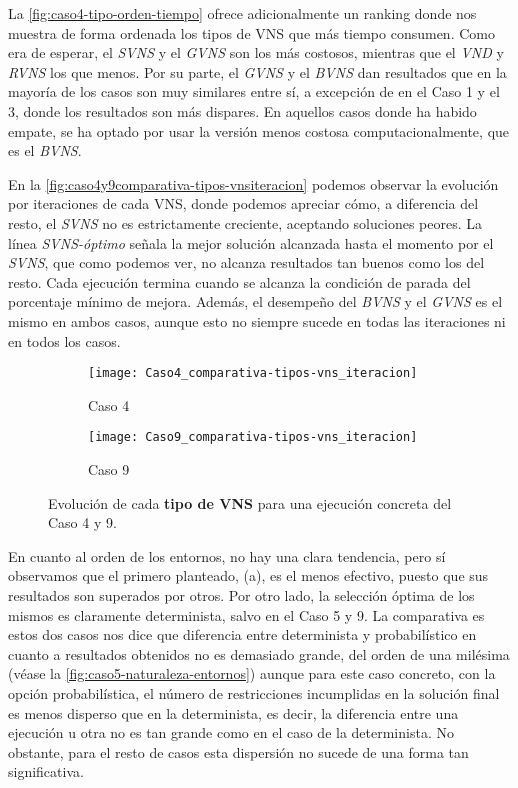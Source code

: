 La \autoref{fig:caso4-tipo-orden-tiempo} ofrece adicionalmente un ranking donde nos muestra de forma ordenada los tipos de VNS que más tiempo consumen. Como era de esperar, el \textit{SVNS} y el \textit{GVNS} son los más costosos, mientras que el \textit{VND} y \textit{RVNS} los que menos. Por su parte, el \textit{GVNS} y el \textit{BVNS} dan resultados que en la mayoría de los casos son muy similares entre sí, a excepción de en el Caso 1 y el 3, donde los resultados son más dispares. En aquellos casos donde ha habido empate, se ha optado por usar la versión menos costosa computacionalmente, que es el \textit{BVNS}.

En la \autoref{fig:caso4y9comparativa-tipos-vnsiteracion} podemos observar la evolución por iteraciones de cada VNS, donde podemos apreciar cómo, a diferencia del resto, el \textit{SVNS} no es estrictamente creciente, aceptando soluciones peores. La línea \textit{SVNS-óptimo} señala la mejor solución alcanzada hasta el momento por el \textit{SVNS}, que como podemos ver, no alcanza resultados tan buenos como los del resto. Cada ejecución termina cuando se alcanza la condición de parada del porcentaje mínimo de mejora. Además, el desempeño del \textit{BVNS} y el \textit{GVNS} es el mismo en ambos casos, aunque esto no siempre sucede en todas las iteraciones ni en todos los casos.

\begin{figure}
	\begin{subfigure}{\linewidth}
		\centering
		\texttt{[image: Caso4\_comparativa-tipos-vns\_iteracion]}
		\caption{Caso 4}
		\label{fig:caso4comparativa-tipos-vnsiteracion}
	\end{subfigure}

	\begin{subfigure}{\linewidth}
		\centering
		\texttt{[image: Caso9\_comparativa-tipos-vns\_iteracion]}
		\caption{Caso 9}
		\label{fig:caso9comparativa-tipos-vnsiteracion}
	\end{subfigure}
	\caption[Evolución de cada tipo de VNS para una ejecución concreta del Caso 4 y 9.]{Evolución de cada \textbf{tipo de VNS} para una ejecución concreta del Caso 4 y 9.}
	\label{fig:caso4y9comparativa-tipos-vnsiteracion}
\end{figure}

En cuanto al orden de los entornos, no hay una clara tendencia, pero sí observamos que el primero planteado, (a), es el menos efectivo, puesto que sus resultados son superados por otros. Por otro lado, la selección óptima de los mismos es claramente determinista, salvo en el Caso 5 y 9. 
La comparativa es estos dos casos nos dice que diferencia entre determinista y probabilístico en cuanto a resultados obtenidos no es demasiado grande, del orden de una milésima (véase la \autoref{fig:caso5-naturaleza-entornos}) aunque para este caso concreto, con la opción probabilística, el número de restricciones incumplidas en la solución final es menos disperso que en la determinista, es decir, la diferencia entre una ejecución u otra no es tan grande como en el caso de la determinista. No obstante, para el resto de casos esta dispersión no sucede de una forma tan significativa.

